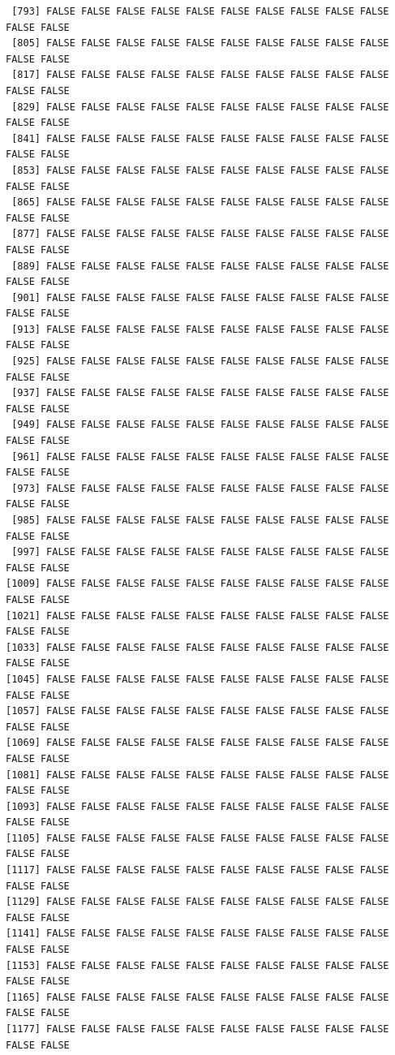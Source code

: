 \documentclass[
  letterpaper,
  DIV=11,
  numbers=noendperiod]{scrreprt}
\begin{document}
\begin{verbatim}
 [793] FALSE FALSE FALSE FALSE FALSE FALSE FALSE FALSE FALSE FALSE FALSE FALSE
 [805] FALSE FALSE FALSE FALSE FALSE FALSE FALSE FALSE FALSE FALSE FALSE FALSE
 [817] FALSE FALSE FALSE FALSE FALSE FALSE FALSE FALSE FALSE FALSE FALSE FALSE
 [829] FALSE FALSE FALSE FALSE FALSE FALSE FALSE FALSE FALSE FALSE FALSE FALSE
 [841] FALSE FALSE FALSE FALSE FALSE FALSE FALSE FALSE FALSE FALSE FALSE FALSE
 [853] FALSE FALSE FALSE FALSE FALSE FALSE FALSE FALSE FALSE FALSE FALSE FALSE
 [865] FALSE FALSE FALSE FALSE FALSE FALSE FALSE FALSE FALSE FALSE FALSE FALSE
 [877] FALSE FALSE FALSE FALSE FALSE FALSE FALSE FALSE FALSE FALSE FALSE FALSE
 [889] FALSE FALSE FALSE FALSE FALSE FALSE FALSE FALSE FALSE FALSE FALSE FALSE
 [901] FALSE FALSE FALSE FALSE FALSE FALSE FALSE FALSE FALSE FALSE FALSE FALSE
 [913] FALSE FALSE FALSE FALSE FALSE FALSE FALSE FALSE FALSE FALSE FALSE FALSE
 [925] FALSE FALSE FALSE FALSE FALSE FALSE FALSE FALSE FALSE FALSE FALSE FALSE
 [937] FALSE FALSE FALSE FALSE FALSE FALSE FALSE FALSE FALSE FALSE FALSE FALSE
 [949] FALSE FALSE FALSE FALSE FALSE FALSE FALSE FALSE FALSE FALSE FALSE FALSE
 [961] FALSE FALSE FALSE FALSE FALSE FALSE FALSE FALSE FALSE FALSE FALSE FALSE
 [973] FALSE FALSE FALSE FALSE FALSE FALSE FALSE FALSE FALSE FALSE FALSE FALSE
 [985] FALSE FALSE FALSE FALSE FALSE FALSE FALSE FALSE FALSE FALSE FALSE FALSE
 [997] FALSE FALSE FALSE FALSE FALSE FALSE FALSE FALSE FALSE FALSE FALSE FALSE
[1009] FALSE FALSE FALSE FALSE FALSE FALSE FALSE FALSE FALSE FALSE FALSE FALSE
[1021] FALSE FALSE FALSE FALSE FALSE FALSE FALSE FALSE FALSE FALSE FALSE FALSE
[1033] FALSE FALSE FALSE FALSE FALSE FALSE FALSE FALSE FALSE FALSE FALSE FALSE
[1045] FALSE FALSE FALSE FALSE FALSE FALSE FALSE FALSE FALSE FALSE FALSE FALSE
[1057] FALSE FALSE FALSE FALSE FALSE FALSE FALSE FALSE FALSE FALSE FALSE FALSE
[1069] FALSE FALSE FALSE FALSE FALSE FALSE FALSE FALSE FALSE FALSE FALSE FALSE
[1081] FALSE FALSE FALSE FALSE FALSE FALSE FALSE FALSE FALSE FALSE FALSE FALSE
[1093] FALSE FALSE FALSE FALSE FALSE FALSE FALSE FALSE FALSE FALSE FALSE FALSE
[1105] FALSE FALSE FALSE FALSE FALSE FALSE FALSE FALSE FALSE FALSE FALSE FALSE
[1117] FALSE FALSE FALSE FALSE FALSE FALSE FALSE FALSE FALSE FALSE FALSE FALSE
[1129] FALSE FALSE FALSE FALSE FALSE FALSE FALSE FALSE FALSE FALSE FALSE FALSE
[1141] FALSE FALSE FALSE FALSE FALSE FALSE FALSE FALSE FALSE FALSE FALSE FALSE
[1153] FALSE FALSE FALSE FALSE FALSE FALSE FALSE FALSE FALSE FALSE FALSE FALSE
[1165] FALSE FALSE FALSE FALSE FALSE FALSE FALSE FALSE FALSE FALSE FALSE FALSE
[1177] FALSE FALSE FALSE FALSE FALSE FALSE FALSE FALSE FALSE FALSE FALSE FALSE

\end{verbatim}
\end{document}
